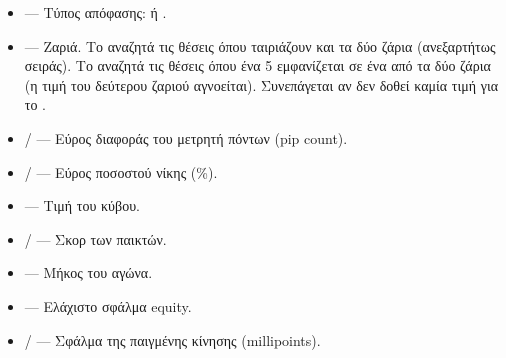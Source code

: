 \documentclass[letterpaper,10pt,greek]{sphinxmanual}
\begin{document}
\sphinxAtStartPar
{}
\begin{itemize}
\item {} 
\sphinxAtStartPar
{} — Τύπος απόφασης:  ή .

\item {} 
\sphinxAtStartPar
{} — Ζαριά. Το  αναζητά τις θέσεις όπου ταιριάζουν και τα δύο ζάρια (ανεξαρτήτως σειράς). Το  αναζητά τις θέσεις όπου ένα 5 εμφανίζεται σε ένα από τα δύο ζάρια (η τιμή του δεύτερου ζαριού αγνοείται). Συνεπάγεται  αν δεν δοθεί καμία τιμή για το .

\item {} 
\sphinxAtStartPar
{} /  — Εύρος διαφοράς του μετρητή πόντων (pip count).

\item {} 
\sphinxAtStartPar
{} /  — Εύρος ποσοστού νίκης (\%).

\item {} 
\sphinxAtStartPar
{} — Τιμή του κύβου.

\item {} 
\sphinxAtStartPar
{} /  — Σκορ των παικτών.

\item {} 
\sphinxAtStartPar
{} — Μήκος του αγώνα.

\item {} 
\sphinxAtStartPar
{} — Ελάχιστο σφάλμα equity.

\item {} 
\sphinxAtStartPar
{} /  — Σφάλμα της παιγμένης κίνησης (millipoints).


\end{itemize}
\end{document}
